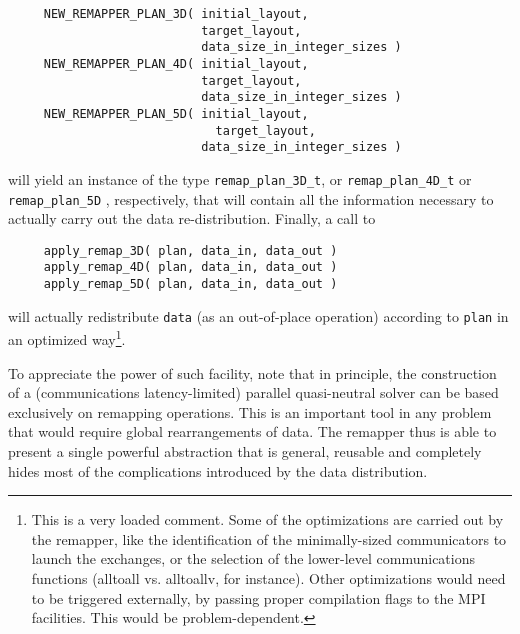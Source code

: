 \documentclass[]{report}   %
\begin{document}
\begin{verbatim}
     NEW_REMAPPER_PLAN_3D( initial_layout, 
                           target_layout, 
                           data_size_in_integer_sizes )
     NEW_REMAPPER_PLAN_4D( initial_layout, 
                           target_layout, 
                           data_size_in_integer_sizes )	
     NEW_REMAPPER_PLAN_5D( initial_layout, 
     	                     target_layout, 
                           data_size_in_integer_sizes )
\end{verbatim}
will yield an instance of the type \verb+remap_plan_3D_t+, or \verb+remap_plan_4D_t+ or \verb+remap_plan_5D+ , respectively, that will contain all the information necessary to actually carry out the data re-distribution. Finally, a call to 

\begin{verbatim}
     apply_remap_3D( plan, data_in, data_out )
     apply_remap_4D( plan, data_in, data_out )
     apply_remap_5D( plan, data_in, data_out )
\end{verbatim}
will actually redistribute \verb+data+ (as an out-of-place operation) according to \verb+plan+ in an optimized way\footnote{This is a very loaded comment. Some of the optimizations are carried out by the remapper, like the identification of the minimally-sized communicators to launch the exchanges, or the selection of the lower-level
communications functions (alltoall vs. alltoallv, for instance). Other optimizations would need to be triggered externally, by passing proper compilation flags to the MPI facilities. This would be problem-dependent.}. 

To appreciate the power of such facility, note that in principle, the construction of a (communications latency-limited) parallel quasi-neutral solver can be based exclusively on remapping operations. This is an important tool in any problem that would require global rearrangements of data. The remapper thus is able to present a single powerful abstraction that is general, reusable and completely hides most of the complications introduced by the data distribution. 

\begin{comment}
Each of these boxes is simply described by several pairs of limits:
\begin{verbatim}
[i_min, i_max], [j_min, j_max], [k_min, k_max], [l_min, l_max],
\end{verbatim}    
(and for a 5D case, also \verb+[m_min, m_max]+) that describe the indices of the $4D$ data contained in each processor.  
\end{comment}
\end{document}
